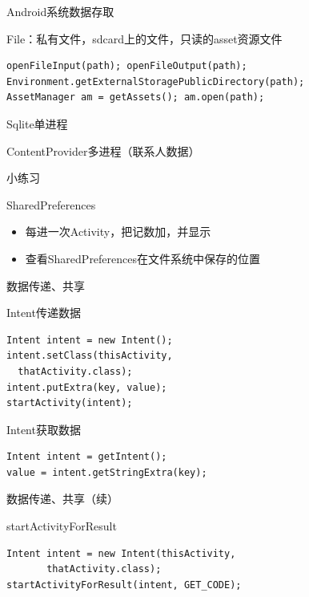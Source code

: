 \documentclass[presentation,dvipdfmx,CJKbookmarks]{beamer}
\begin{document}
\begin{CJK*}{UTF8}{simsun}
\begin{frame}[fragile,label={sec:org4e6177f}]{Android\thinspace 系统数据存取}
\begin{block}{File：私有文件，sdcard\thinspace 上的文件，只读的\thinspace asset\thinspace 资源文件}
\begin{verbatim}
openFileInput(path); openFileOutput(path);
Environment.getExternalStoragePublicDirectory(path);
AssetManager am = getAssets(); am.open(path);
\end{verbatim}
\end{block}
\begin{block}{Sqlite\thinspace 单进程}
\end{block}
\begin{block}{ContentProvider\thinspace 多进程（联系人数据）}
\end{block}
\end{frame}
\begin{frame}[label={sec:org122474f}]{小练习}
\begin{block}{SharedPreferences}
\begin{itemize}
\item 每进一次\thinspace Activity，把记数加，并显示
\item 查看\thinspace SharedPreferences\thinspace 在文件系统中保存的位置
\end{itemize}
\end{block}
\end{frame}

\begin{frame}[fragile,label={sec:org31a5a39}]{数据传递、共享}
 \begin{block}{Intent\thinspace 传递数据}
\begin{verbatim}
Intent intent = new Intent();
intent.setClass(thisActivity,
  thatActivity.class);
intent.putExtra(key, value);
startActivity(intent);
\end{verbatim}
\end{block}

\begin{block}{Intent\thinspace 获取数据}
\begin{verbatim}
Intent intent = getIntent();
value = intent.getStringExtra(key);
\end{verbatim}
\end{block}
\end{frame}
\begin{frame}[fragile,label={sec:org736affb}]{数据传递、共享（续）}
 \begin{block}{startActivityForResult}
\begin{verbatim}
Intent intent = new Intent(thisActivity,
       thatActivity.class);
startActivityForResult(intent, GET_CODE);


\end{verbatim}
\end{block}
\end{frame}
\end{CJK*}
\end{document}
